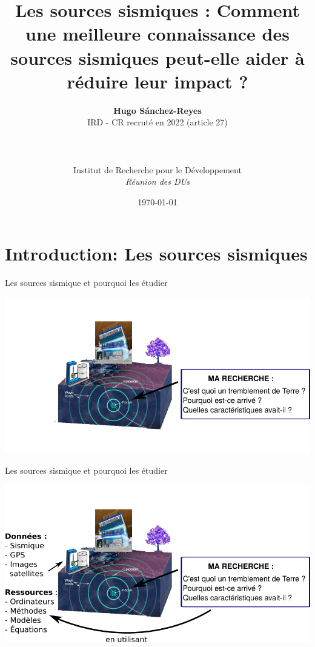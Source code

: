 \documentclass{beamer}
\title{{\normalsize \vskip 1.5cm {\bf Les sources sismiques :} Comment une meilleure connaissance des sources sismiques peut-elle aider à réduire leur impact ?}}
\author{ {\bf Hugo Sánchez-Reyes} \\ IRD - CR recruté en 2022 (article 27) \\
\\ 
\\
\\
\vfill
{Institut de Recherche pour le Développement} \\
\textit{Réunion des DUs}
}
\date[2022]{\today}
\begin{document}

\begin{frame}
    \titlepage
\end{frame}

\section{Introduction: Les sources sismiques}

\begin{frame}
{Les sources sismique et pourquoi les étudier}

    \begin{center}
        \vskip -0.3cm \includegraphics[width=1\linewidth]{images/earthquake_whys_whats_1-1} \\     
    \end{center}
    
\end{frame}


\begin{frame}
{Les sources sismique et pourquoi les étudier}

    \begin{center}
        \vskip -0.3cm \includegraphics[width=1\linewidth]{images/earthquake_whys_whats_2-1} \\     
    \end{center}
    \addtocounter{framenumber}{-1}
    
\end{frame}
\end{document}
